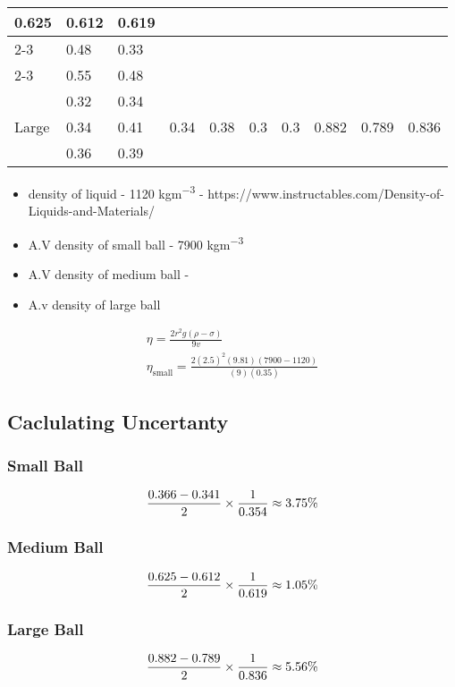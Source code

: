 \documentclass{article}
\begin{document}
\begin{center}
\begin{tabular}{|l|l|l|l|l|l|l|l|l|l|}
							\multirow{3}{*}{0.625} & \multirow{3}{*}{0.612} &
							\multirow{3}{*}{0.619} \\ \cline{2-3}
                        & 0.48 & 0.33 & & & & & & & \\ \cline{2-3}
                        & 0.55 & 0.48 & & & & & & & \\ \hline
\multirow{3}{*}{Large}  & 0.32 & 0.34 &
							\multirow{3}{*}{0.34} & \multirow{3}{*}{0.38} &
							\multirow{3}{*}{0.3}  & \multirow{3}{*}{0.3}  &
							\multirow{3}{*}{0.882} & \multirow{3}{*}{0.789} &
							\multirow{3}{*}{0.836}
						    \\ \cline{2-3}
                        & 0.34 & 0.41 & & & & & & & \\ \cline{2-3}
                        & 0.36 & 0.39 & & & & & & & \\ \hline
\end{tabular}

\end{center}
\begin{itemize}
	\item density of liquid - 1120 \si{kgm^{-3}} - https://www.instructables.com/Density-of-Liquids-and-Materials/
	\item A.V density of small ball - 7900 \si{kgm^{-3}}
	\item A.V density of medium ball -
	\item A.v density of large ball 
\end{itemize}

\begin{gather}
	\eta = \frac{2r^2g(\rho - \sigma)}{9v} \\
	\eta_{\text{small}} = \frac{2(2.5)^2(9.81)(7900 - 1120)}{(9)(0.35)}
\end{gather}

\subsection{Caclulating Uncertanty}

\subsubsection{Small Ball}
\begin{equation}
	\frac{0.366 - 0.341}{2} \times \frac{1}{0.354} \approx 3.75 \% \\
\end{equation}

\subsubsection{Medium Ball}
\begin{equation}
	\frac{0.625 - 0.612}{2} \times \frac{1}{0.619} \approx 1.05 \% \\
\end{equation}

\subsubsection{Large Ball}

\begin{equation}
	\frac{0.882 - 0.789}{2} \times \frac{1}{0.836} \approx 5.56 \% \\
\end{equation}
\end{document}
